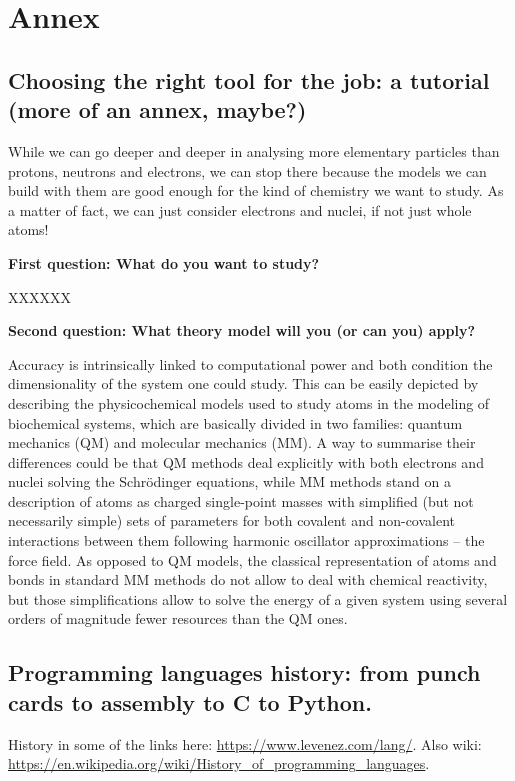 \chapter{Annex}
\label{appendixA}

\section{Choosing the right tool for the job: a tutorial (more of an annex, maybe?)}
While we can go deeper and deeper in analysing more elementary particles than protons, neutrons and electrons, we can stop there because the models we can build with them are good enough for the kind of chemistry we want to study. As a matter of fact, we can just consider electrons and nuclei, if not just whole atoms!

\textbf{First question: What do you want to study?}

XXXXXX

\textbf{Second question: What theory model will you (or can you) apply?}

Accuracy is intrinsically linked to computational power and both condition the dimensionality of the system one could study. This can be easily depicted by describing the physicochemical models used to study atoms in the modeling of biochemical systems, which are basically divided in two families: quantum mechanics (QM) and molecular mechanics (MM). A way to summarise their differences could be that QM methods deal explicitly with both electrons and nuclei solving the Schrödinger equations, while MM methods stand on a description of atoms as charged single-point masses with simplified (but not necessarily simple) sets of parameters for both covalent and non-covalent interactions between them following harmonic oscillator approximations – the force field. As opposed to QM models, the classical representation of atoms and bonds in standard MM methods do not allow to deal with chemical reactivity, but those simplifications allow to solve the energy of a given system using several orders of magnitude fewer resources than the QM ones.

\section{Programming languages history: from punch cards to assembly to C to Python. }
History in some of the links here: \href{https://www.levenez.com/lang/}{https://www.levenez.com/lang/}. Also wiki: \href{https://en.wikipedia.org/wiki/History\_of\_programming\_languages}{https://en.wikipedia.org/wiki/History\_of\_programming\_languages}.

